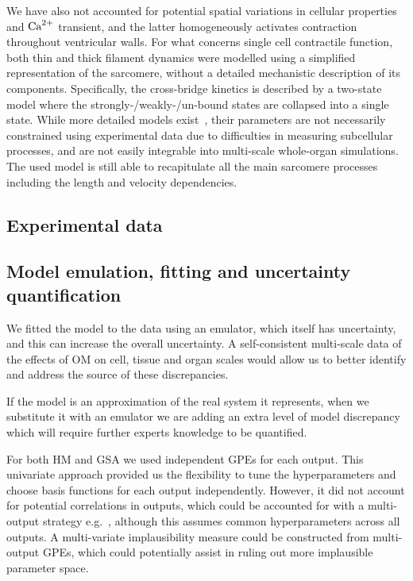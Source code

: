 \vspace{0.2cm}
We have also not accounted for potential spatial variations in cellular properties and $\textrm{Ca}^{2+}$ transient, and the latter homogeneously activates contraction throughout ventricular walls. For what concerns single cell contractile function, both thin and thick filament dynamics were modelled using a simplified representation of the sarcomere, without a detailed mechanistic description of its components. Specifically, the cross-bridge kinetics is described by a two-state model where the strongly-/weakly-/un-bound states are collapsed into a single state. While more detailed models exist~\cite{Land:2015}, their parameters are not necessarily constrained using experimental data due to difficulties in measuring subcellular processes, and are not easily integrable into multi-scale whole-organ simulations. The used model is still able to recapitulate all the main sarcomere processes including the length and velocity dependencies.


%
%
%
\subsection{Experimental data}\label{sec:ch9experimental_data}

%
%
%
\subsection{Model emulation, fitting and uncertainty quantification}\label{sec:ch9model_emulation_fitting_and_uncertainty_quantification}
We fitted the model to the data using an emulator, which itself has uncertainty, and this can increase the overall uncertainty. A self-consistent multi-scale data of the effects of OM on cell, tissue and organ scales would allow us to better identify and address the source of these discrepancies.

\vspace{0.2cm}
If the model is an approximation of the real system it represents, when we substitute it with an emulator we are adding an extra level of model discrepancy which will require further experts knowledge to be quantified.

\vspace{0.2cm}
For both HM and GSA we used independent GPEs for each output. This univariate approach provided us the flexibility to tune the hyperparameters and choose basis functions for each output independently. However, it did not account for potential correlations in outputs, which could be accounted for with a multi-output strategy e.g.~\cite{Conti:2009}, although this assumes common hyperparameters across all outputs. A multi-variate implausibility measure could be constructed from multi-output GPEs, which could potentially assist in ruling out more implausible parameter space.

